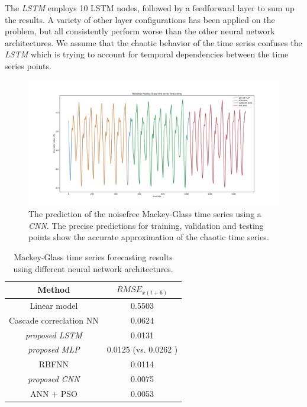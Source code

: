 \documentclass{article}
\begin{document}
The \emph{LSTM} employs 10 LSTM nodes, followed by a feedforward layer to sum up
the results. A variety of other layer configurations has been applied
on the problem,
but all consistently perform worse than the other neural network architectures.
We assume that the chaotic behavior of the time series confuses the \emph{LSTM}
which is trying to account for temporal dependencies between the time series
points.

\begin{figure}
    \centering
    \includegraphics[width=\textwidth]{figures/mg_pred_cnn.pdf}
    \caption{The prediction of the noisefree Mackey-Glass time series using a
        \emph{CNN}. The precise predictions for training, validation and testing
        points show the accurate approximation of the chaotic time series.}
    \label{fig:mackey_pred}
\end{figure}

\begin{table}
    \centering
    \begin{tabular}{c|c}
        Method                         & $RMSE_{x(t+6)}$                          \\
        \hline
        Linear model                   & 0.5503                                   \\
        Cascade correclation NN        & 0.0624                                   \\
        \textit{proposed LSTM}         & 0.0131                                   \\
        \textit{proposed MLP}          & 0.0125 (vs. 0.0262 \cite{caraballo2016}) \\
        RBFNN                          & 0.0114                                   \\
        \textit{proposed CNN}          & 0.0075                                   \\
        ANN + PSO \cite{caraballo2016} & 0.0053                                   \\
    \end{tabular}
    \caption{Mackey-Glass time series forecasting results using different neural
        network architectures.}
    \label{tab:mackey_results}
\end{table}
\end{document}
